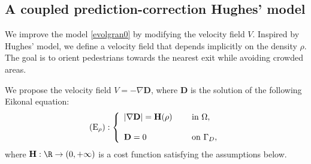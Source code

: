 \documentclass[final,reqno]{amsart}
\theoremstyle{plain}
\theoremstyle{definition}
\theoremstyle{remark}
\numberwithin{remark}{section}	%
\numberwithin{example}{section}	%
\newcommand{\de}{\mathbf{D}}
\newcommand{\he}{\mathbf{H}}
\begin{document}
 \subsection{A coupled prediction-correction Hughes' model }\label{sec:model}

We improve the model \eqref{evolgran0} by modifying the velocity field $V$. Inspired by Hughes' model, we define a velocity field that depends implicitly on the density $\rho$. The goal is to orient pedestrians towards the nearest exit while avoiding crowded areas.

We propose the velocity field $V=-\nabla \de$, where $\de$ is the solution of the following Eikonal equation:
\begin{equation}\label{eq:V-model}
	(\textup{E}_\rho):	\left\{ \begin{array}{ll}
		\vert \nabla \de\vert =\he(\rho)\quad & \hbox{ in }\Omega,\\   \\
		\de =0 & \hbox{ on }\Gamma_D,
	\end{array}
	\right.
\end{equation}
where $\he:\R \to  (0,+\infty)$ is a cost function satisfying the assumptions below.
\end{document}
